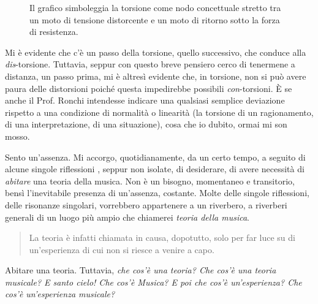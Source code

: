 \documentclass{../../lib/gs}
\begin{document}
\begin{figure}[htbp]
\begin{center}
\caption{Il grafico simboleggia la torsione come nodo concettuale stretto tra un
moto di tensione distorcente e un moto di ritorno sotto la forza di resistenza.}
\label{torsione}
\end{center}
\end{figure}

Mi è evidente che c'è un passo della torsione, quello successivo, che conduce
alla \emph{dis}-torsione. Tuttavia, seppur con questo breve pensiero cerco di
tenermene a distanza, un passo prima, mi è altresì evidente che, in torsione,
non si può avere paura delle distorsioni poiché questa impedirebbe possibili
\emph{con}-torsioni. È se anche il Prof. Ronchi intendesse indicare una qualsiasi
semplice deviazione rispetto a una condizione di normalità o linearità (la
torsione di un ragionamento, di una interpretazione, di una situazione), cosa
che io dubito, ormai mi son mosso.

Sento un'assenza. Mi accorgo, quotidianamente, da un certo tempo, a seguito di
alcune singole riflessioni \cite{silvi2023a, silvi2023b, silvi2023c, silvi2024},
seppur non isolate, di desiderare, di avere necessità di \emph{abitare} una
teoria della musica. Non è un bisogno, momentaneo e transitorio, bensì
l'inevitabile presenza di un'assenza, costante. Molte delle singole riflessioni,
delle risonanze singolari, vorrebbero appartenere a un riverbero, a riverberi
generali di un luogo più ampio che chiamerei \emph{teoria della musica}.

\begin{quote}
\begin{sf}
\small
  La teoria è infatti chiamata in causa, dopotutto, solo per far luce su di
  un'esperienza di cui non si riesce a venire a capo. \cite{ronchi2001}
  \end{sf}
\end{quote}

Abitare una teoria. Tuttavia, \emph{che cos'è una teoria? Che cos'è una teoria
musicale? E santo cielo! Che cos'è Musica? E poi che cos'è un'esperienza? Che
cos'è un'esperienza musicale?}
\end{document}
